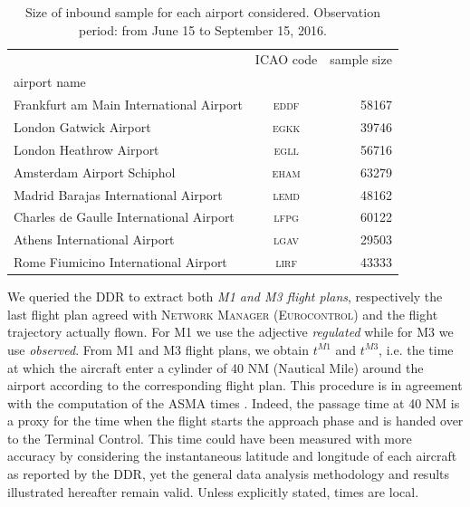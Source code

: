 \documentclass[draft,review]{elsarticle}
\makeatletter
\newcommand*{\ie}{i.e.\@\xspace}
\newcommand{\airp}[1]{\textcolor{#1}{\textsc{#1}}}
\makeatother
\begin{document}
\begin{table}[tbp]
  \caption{Size of inbound sample for each airport considered. Observation period: from June 15 to September 15, 2016.}\label{tab:flights_count}
    \begin{tabular}{lcr}
      \toprule
      {} & \acs{ICAO} code &  sample size \\
      airport name                                       &                 &              \\
      \midrule
      Frankfurt am Main International Airport &     \airp{eddf} &        58167 \\
      London Gatwick Airport                  &     \airp{egkk} &        39746 \\
      London Heathrow Airport                 &     \airp{egll} &        56716 \\
      Amsterdam Airport Schiphol              &     \airp{eham} &        63279 \\
      Madrid Barajas International Airport    &     \airp{lemd} &        48162 \\
      Charles de Gaulle International Airport &     \airp{lfpg} &        60122 \\
      Athens International Airport            &     \airp{lgav} &        29503 \\
      Rome Fiumicino International Airport    &     \airp{lirf} &        43333 \\
      \bottomrule
    \end{tabular}
\end{table}

We queried the \ac{DDR} to extract both \emph{M1 and M3 flight plans}, respectively the last flight plan agreed with \textsc{Network Manager} (\textsc{Eurocontrol}) and the flight trajectory actually flown.
For M1 we use the adjective \emph{regulated} while for M3 we use \emph{observed}.
From M1 and M3 flight plans, we obtain \(t^{M1}\) and \(t^{M3}\), \ie{} the time at which the aircraft enter a cylinder of 40 NM (Nautical Mile) around the airport according to the corresponding flight plan.
This procedure is in agreement with the computation of the ASMA times \citep{ASMA-def}.
Indeed, the passage time at 40 NM is a proxy for the time when the flight starts the approach phase and is handed over to the Terminal Control.
This time could have been measured with more accuracy by considering the instantaneous latitude and longitude of each aircraft as reported by the \ac{DDR}, yet the general data analysis methodology and results illustrated hereafter remain valid.
Unless explicitly stated, times are local.
\end{document}
